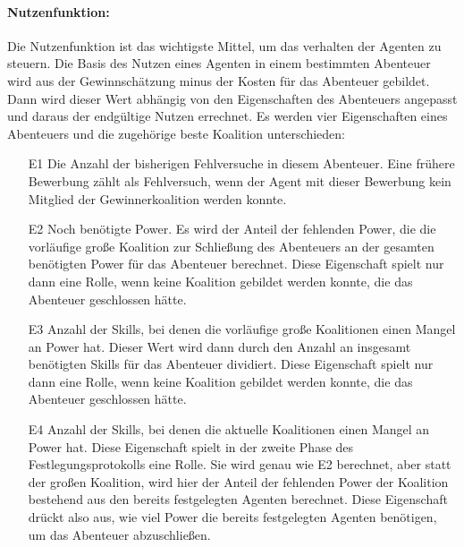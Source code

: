 \documentclass[fleqn,10pt]{SelfArx} %
\begin{document}
\paragraph{Nutzenfunktion:}
Die Nutzenfunktion ist das wichtigste Mittel, um das verhalten der Agenten zu steuern. Die Basis des Nutzen eines Agenten in einem bestimmten Abenteuer wird aus der Gewinnschätzung minus der Kosten für das Abenteuer gebildet. Dann wird dieser Wert abhängig von den Eigenschaften des Abenteuers angepasst und daraus der endgültige Nutzen errechnet. Es werden vier Eigenschaften eines Abenteuers und die zugehörige beste Koalition unterschieden:
\begin{itemize}
  \item[E1] Die Anzahl der bisherigen Fehlversuche in diesem Abenteuer. Eine frühere Bewerbung zählt als Fehlversuch, wenn der Agent mit dieser Bewerbung kein Mitglied der Gewinnerkoalition werden konnte.
  \item[E2] Noch benötigte Power. Es wird der Anteil der fehlenden Power, die die vorläufige große Koalition zur Schließung des Abenteuers an der gesamten benötigten Power für das Abenteuer berechnet. Diese Eigenschaft spielt nur dann eine Rolle, wenn keine Koalition gebildet werden konnte, die das Abenteuer geschlossen hätte.
  \item[E3] Anzahl der Skills, bei denen die vorläufige große Koalitionen einen Mangel an Power hat. Dieser Wert wird dann durch den Anzahl an insgesamt benötigten Skills für das Abenteuer dividiert. Diese Eigenschaft spielt nur dann eine Rolle, wenn keine Koalition gebildet werden konnte, die das Abenteuer geschlossen hätte.
  \item[E4] Anzahl der Skills, bei denen die aktuelle Koalitionen einen Mangel an Power hat. Diese Eigenschaft spielt in der zweite Phase des Festlegungsprotokolls eine Rolle. Sie wird genau wie E2 berechnet, aber statt der großen Koalition, wird hier der Anteil der fehlenden Power der Koalition bestehend aus den bereits festgelegten Agenten berechnet. Diese Eigenschaft drückt also aus, wie viel Power die bereits festgelegten Agenten benötigen, um das Abenteuer abzuschließen. 
\end{itemize}
\end{document}
